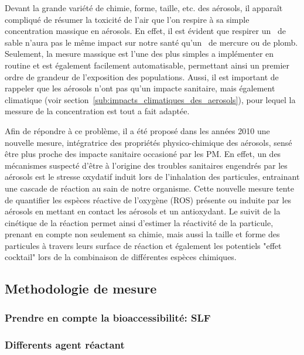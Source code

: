 Devant la grande variété de chimie, forme, taille, etc. des aérosols, il apparaît
compliqué de résumer la toxicité de l'air que l'on respire à sa simple concentration
massique en aérosols. En effet, il est évident que respirer un~\si{\ugm} de sable n'aura
pas le même impact sur notre santé qu'un~\si{\ugm} de mercure ou de plomb.
Seulement, la mesure massique est l'une des plus simples a implémenter en routine et est
également facilement automatisable, permettant ainsi un premier ordre de grandeur de 
l'exposition des populations. Aussi, il est important de rappeler que les aérosols n'ont
pas qu'un impacte sanitaire, mais également climatique (voir
section~\ref{sub:impacts_climatiques_des_aerosols}), pour lequel la messure de la concentration est tout a
fait adaptée.

Afin de répondre à ce problème, il a été proposé dans les années 2010 une nouvelle mesure,
intégratrice des propriétés physico-chimique des aérosols, sensé être plus proche des
impacte sanitaire occasioné par les PM. En effet, un des mécanismes suspecté d'être à
l'origine des troubles sanitaires engendrés par les aérosols est le stresse oxydatif
induit lors de l'inhalation des particules, entrainant une cascade de réaction au sain de
notre organisme.
Cette nouvelle mesure tente de quantifier les espèces réactive de l'oxygène (ROS) présente
ou induite par les aérosols en mettant en contact les aérosols et un antioxydant.
Le suivit de la cinétique de la réaction permet ainsi d'estimer la réactivité de la
particule, prenant en compte non seulement sa chimie, mais aussi la taille et forme des
particules à travers leurs surface de réaction et également les potentiels "effet
cocktail" lors de la combinaison de différentes espèces chimiques.

\subsection{Methodologie de mesure}%
\label{sub:methodologie_de_mesure}

\subsubsection{Prendre en compte la bioaccessibilité: SLF}%
\label{sub:prendre_en_compte_la_bioaccessibilite_slf}

\subsubsection{Differents agent réactant}%
\label{ssub:differents_agent_reactant}

